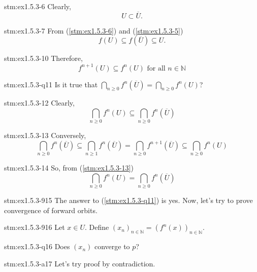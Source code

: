 \begin{statement}{stm:ex1.5.3-6}
Clearly,
$$U \subset \overline{U}.$$
\end{statement}

\begin{statement}{stm:ex1.5.3-7}
From (\ref{stm:ex1.5.3-6}) and (\ref{stm:ex1.5.3-5})
$$f(U) \subseteq f(\overline{U}) \subseteq U.$$
\end{statement}

\begin{statement}{stm:ex1.5.3-10}
Therefore, 
$$f^{n+1}(U) \subseteq f^n(U) \text{ for all } n \in \mathbb{N}$$
\end{statement}
    
\begin{explanation}{stm:ex1.5.3-q11}
Is it true that $\bigcap_{n \ge 0} f^n(\overline{U}) = \bigcap_{n \ge 0} f^n(U)$?
\end{explanation}

\begin{statement}{stm:ex1.5.3-12}
Clearly,
$$\bigcap_{n \ge 0} f^n(U) \subseteq \bigcap_{n \ge 0} f^n(\overline{U})$$
\end{statement}

\begin{statement}{stm:ex1.5.3-13}
Conversely, 
$$\bigcap_{n \ge 0} f^n(\overline{U}) \subseteq \bigcap_{n \ge 1} f^n(\overline{U}) = \bigcap_{n \ge 0} f^{n+1}(\overline{U}) \subseteq \bigcap_{n \ge 0} f^n(U)$$
\end{statement}

\begin{statement}{stm:ex1.5.3-14}
So, from (\ref{stm:ex1.5.3-13})
$$\bigcap_{n \ge 0} f^n(U) = \bigcap_{n \ge 0} f^n(\overline{U})$$
\end{statement}

\begin{explanation}{stm:ex1.5.3-915}
The answer to (\ref{stm:ex1.5.3-q11}) is yes. Now, let's try to prove convergence of forward orbits. 
\end{explanation}

\begin{statement}{stm:ex1.5.3-916}
Let $x \in U$. Define $(x_n)_{n \in \mathbb{N}} = (f^n(x))_{n \in \mathbb{N}}$.
\end{statement}

\begin{explanation}{stm:ex1.5.3-q16}
Does $(x_n)$ converge to $p$?
\end{explanation}

\begin{explanation}{stm:ex1.5.3-a17}
Let's try proof by contradiction. 
\end{explanation}

